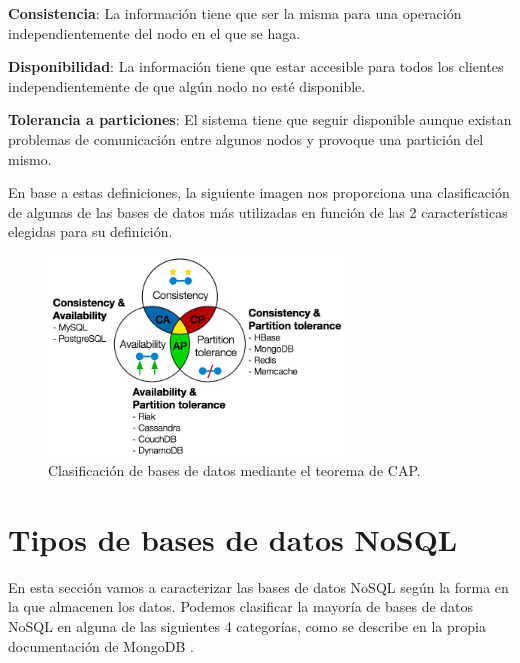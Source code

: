 \textbf{Consistencia}: La información tiene que ser la misma para una operación independientemente del nodo en el que se haga.

\textbf{Disponibilidad}: La información tiene que estar accesible para todos los clientes independientemente de que algún nodo no esté disponible.

\textbf{Tolerancia a particiones}: El sistema tiene que seguir disponible aunque existan problemas de comunicación entre algunos nodos y provoque una partición del mismo.

En base a estas definiciones, la siguiente imagen nos proporciona una clasificación de algunas de las bases de datos más utilizadas en función de las 2 características elegidas para su definición.

\begin{figure}[h]
  \centering
  \includegraphics[width=0.7\textwidth]{gfx/CAPTheorem.png}
  \caption{Clasificación de bases de datos mediante el teorema de CAP.}
\end{figure}

\section{Tipos de bases de datos NoSQL}

En esta sección vamos a caracterizar las bases de datos NoSQL según la forma en la que almacenen los datos. Podemos clasificar la mayoría de bases de datos NoSQL en alguna de las siguientes 4 categorías, como se describe en la propia documentación de MongoDB \cite{mongoclassification}.

